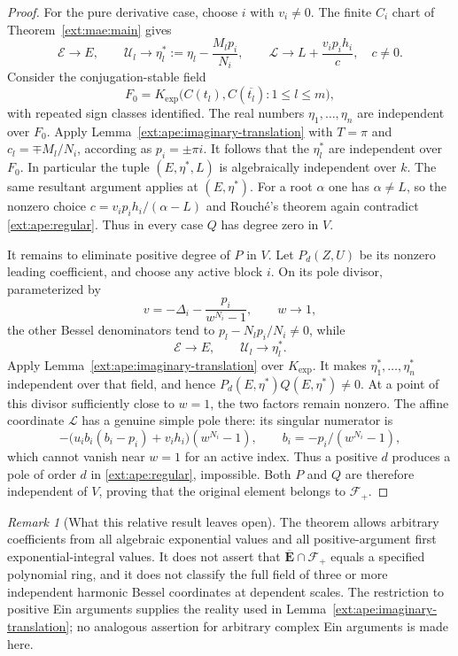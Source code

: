 \documentclass[11pt,a4paper]{article}
\theoremstyle{definition}\newtheorem{definition}[theorem]{Definition}
\theoremstyle{remark}\newtheorem{remark}[theorem]{Remark}
\begin{document}
\begin{proof}
For the pure derivative case, choose $i$ with $v_i\ne0$.  The finite
$C_i$ chart of Theorem~\ref{ext:mae:main} gives
\[
 \mathcal E\longrightarrow E,\qquad
 \mathcal U_l\longrightarrow
       \eta_l^*:=\eta_l-\frac{M_lp_i}{N_i},\qquad
 \mathcal L\longrightarrow L+\frac{v_i p_i h_i}{c},
 \quad c\ne0.
\]
Consider the conjugation-stable field
\[
 F_0=K_{\exp}\bigl(C(t_l),C(\overline{t_l}):1\le l\le m\bigr),
\]
with repeated sign classes identified.  The real numbers
$\eta_1,\ldots,\eta_n$ are independent over $F_0$.  Apply
Lemma~\ref{ext:ape:imaginary-translation} with $T=\pi$ and
$c_l=\mp M_l/N_i$, according as $p_i=\pm\pi i$.  It follows that
the $\eta_l^*$ are independent over $F_0$.  In particular the tuple
$(E,\eta^*,L)$ is algebraically independent over $k$.  The same
resultant argument applies at $(E,\eta^*)$.  For a root $\alpha$
one has $\alpha\ne L$, so the nonzero choice
$c=v_i p_i h_i/(\alpha-L)$ and Rouch\'e's theorem again contradict
\eqref{ext:ape:regular}.  Thus in every case $Q$ has degree zero in $V$.

It remains to eliminate positive degree of $P$ in $V$.  Let $P_d(Z,U)$
be its nonzero leading coefficient, and choose any active block $i$.
On its pole divisor, parameterized by
\[
             v=-\Delta_i-\frac{p_i}{w^{N_i}-1},\qquad w\to1,
\]
the other Bessel denominators tend to
$p_l-N_lp_i/N_i\ne0$, while
\[
                   \mathcal E\longrightarrow E,
       \qquad \mathcal U_l\longrightarrow\eta_l^*.
\]
Apply Lemma~\ref{ext:ape:imaginary-translation} over $K_{\exp}$.
It makes $\eta_1^*,\ldots,\eta_n^*$ independent over that field,
and hence
$P_d(E,\eta^*)Q(E,\eta^*)\ne0$.
At a point of this divisor sufficiently close to $w=1$, the two
factors remain nonzero.  The affine coordinate $\mathcal L$ has a
genuine simple pole there: its singular numerator is
\[
 -\bigl(u_i b_i(b_i-p_i)+v_i h_i\bigr)(w^{N_i}-1),
 \qquad b_i=-p_i/(w^{N_i}-1),
\]
which cannot vanish near $w=1$ for an active index.  Thus a positive
$d$ produces a pole of order $d$ in \eqref{ext:ape:regular}, impossible.
Both $P$ and $Q$ are therefore independent of $V$, proving that the
original element belongs to $\mathcal F_+$.
\end{proof}

\begin{remark}[What this relative result leaves open]
The theorem allows arbitrary coefficients from all algebraic exponential
values and all positive-argument first exponential-integral values.
It does not assert that
$\overline{\mathbf E}\cap\mathcal F_+$ equals a specified polynomial
ring, and it does not classify the full field of three or more
independent harmonic Bessel coordinates at dependent scales.  The
restriction to positive Ein arguments supplies the reality used in
Lemma~\ref{ext:ape:imaginary-translation}; no analogous assertion for
arbitrary complex Ein arguments is made here.
\end{remark}
\end{document}
